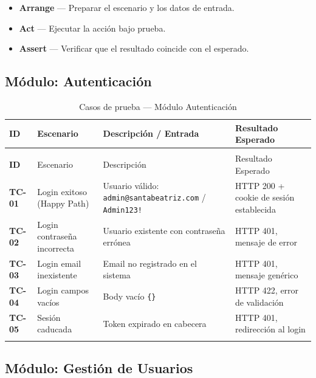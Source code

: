 \documentclass[12pt, letterpaper]{article}
\begin{document}
\begin{itemize}[leftmargin=2em, itemsep=4pt]
  \item \textbf{Arrange} --- Preparar el escenario y los datos de entrada.
  \item \textbf{Act} --- Ejecutar la acción bajo prueba.
  \item \textbf{Assert} --- Verificar que el resultado coincide con el esperado.
\end{itemize}

\subsection{Módulo: Autenticación}

\begin{longtable}{>{\bfseries\small}p{1.2cm} p{3.2cm} p{4.5cm} p{3.5cm}}
\toprule
\textcolor{lasalleBlue}{ID} &
\textcolor{lasalleBlue}{Escenario} &
\textcolor{lasalleBlue}{Descripción / Entrada} &
\textcolor{lasalleBlue}{Resultado Esperado} \\
\midrule
\endfirsthead
\multicolumn{4}{l}{\footnotesize\textit{Continuación...}} \\
\midrule
ID & Escenario & Descripción & Resultado Esperado \\
\midrule
\endhead
TC-01 & Login exitoso (Happy Path) &
  Usuario válido: \texttt{admin@santabeatriz.com} / \texttt{Admin123!} &
  HTTP 200 + cookie de sesión establecida \\[4pt]
TC-02 & Login contraseña incorrecta &
  Usuario existente con contraseña errónea &
  HTTP 401, mensaje de error \\[4pt]
TC-03 & Login email inexistente &
  Email no registrado en el sistema &
  HTTP 401, mensaje genérico \\[4pt]
TC-04 & Login campos vacíos &
  Body vacío \texttt{\{\}} &
  HTTP 422, error de validación \\[4pt]
TC-05 & Sesión caducada &
  Token expirado en cabecera &
  HTTP 401, redirección al login \\
\bottomrule
\caption{Casos de prueba --- Módulo Autenticación}
\end{longtable}

\subsection{Módulo: Gestión de Usuarios}
\end{document}
